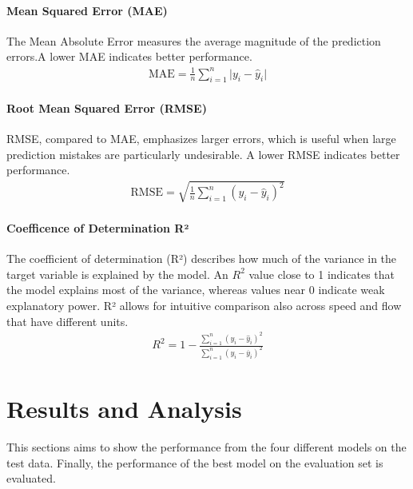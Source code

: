 	\paragraph{Mean Squared Error (MAE)}
	The Mean Absolute Error measures the average magnitude of the prediction errors.A lower MAE indicates better performance.
	\begin{align}
		\text{MAE}=\frac{1}{n}\sum_{i=1}^{n}\vert y_i-\hat{y}_i\vert
	\end{align}
	\paragraph{Root Mean Squared Error (RMSE)}
	RMSE, compared to MAE, emphasizes larger errors, which is useful when large prediction mistakes are particularly undesirable. A lower RMSE indicates better performance.
	\begin{align}
		\text{RMSE}=\sqrt{\frac{1}{n}\sum_{i=1}^{n}\left( y_i-\hat{y}_i \right)^2}
	\end{align}
	\paragraph{Coefficence of Determination R²}
	The coefficient of determination (R²) describes how much of the variance in the target variable is explained by the model. An $R^2$
	value close to 1 indicates that the model explains most of the variance, whereas values near 0 indicate weak explanatory power. R² allows for intuitive comparison also across speed and flow that have different units.
	\begin{align}
		R^2=1- \frac{\sum_{i=1}^{n}\left( y_i-\hat{y}_i \right)^2}{\sum_{i=1}^{n}\left( y_i-\overline{y}_i \right)^2}
	\end{align}
	
	\section{Results and Analysis}
	This sections aims to show the performance from the four different models on the test data. Finally, the performance of the best model on the evaluation set is evaluated.

